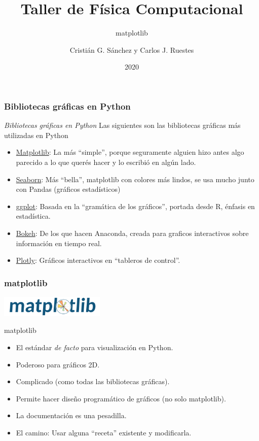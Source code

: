 \documentclass{beamer}
\title{Taller de Física Computacional}
\subtitle{matplotlib}
\author{Cristián G. Sánchez y Carlos J. Ruestes}
\date{2020}
\begin{document}
\frame{\titlepage}


\begin{frame}[fragile]
    \frametitle{Bibliotecas gráficas en Python}
    \begin{block}{{\em Bibliotecas gráficas en Python}}
        Las siguientes son las bibliotecas gráficas más utilizadas en Python
    \begin{itemize}
    \item \href{https://matplotlib.org}{Matplotlib}: La más ``simple'', porque seguramente alguien hizo antes algo parecido a lo que querés hacer y lo escribió en algún lado.
    \item \href{http://seaborn.pydata.org}{Seaborn}: Más ``bella'', matplotlib con colores más lindos, se usa mucho junto con Pandas (gráficos estadísticos)
    \item \href{http://ggplot.yhathq.com}{ggplot}: Basada en la ``gramática de los gráficos'', portada desde R, énfasis en estadística.
    \item \href{https://docs.bokeh.org/en/latest/}{Bokeh}: De los que hacen Anaconda, creada para graficos interactivos sobre información en tiempo real.
    \item \href{https://plotly.com}{Plotly}: Gráficos interactivos en ``tableros de control''.
    \end{itemize}
\end{block}    
\end{frame}

\begin{frame}[fragile]
    \frametitle{matplotlib}
    \includegraphics[width=5cm]{figuras/matplotlib.png}
    \begin{block}{matplotlib}
        \begin{itemize}
            \item El estándar {\em de facto} para visualización en Python.
            \item Poderoso para gráficos 2D.
            \item Complicado (como todas las bibliotecas gráficas).
            \item Permite hacer diseño programático de gráficos (no solo matplotlib).
            \item La documentación es una pesadilla.
            \item El camino: Usar alguna ``receta'' existente y modificarla.
        \end{itemize}
    \end{block}
    \end{frame}
\end{document}
